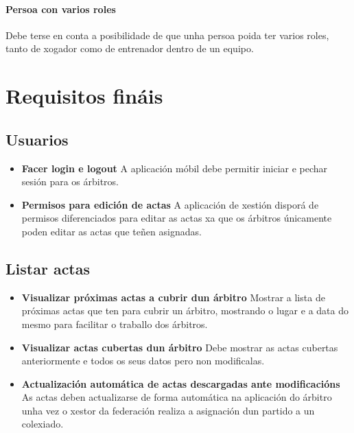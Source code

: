   \paragraph{Persoa con varios roles}
  Debe terse en conta a posibilidade de que unha persoa poida ter varios roles, 
tanto de xogador como de entrenador dentro de un equipo.
  
  \clearpage

  \section{Requisitos fináis}
  
  \subsection{Usuarios}

    \begin{itemize}

    \item \textbf{Facer login e logout}
    A aplicación móbil debe permitir iniciar e pechar sesión para os árbitros.

    \item \textbf{Permisos para edición de actas}
    A aplicación de xestión disporá de permisos diferenciados para editar as 
actas xa que os árbitros únicamente poden editar as actas que teñen asignadas.

    \end{itemize}

  \subsection{Listar actas}

    \begin{itemize}

    \item \textbf{Visualizar próximas actas a cubrir dun árbitro}
    Mostrar a lista de próximas actas que ten para cubrir un árbitro, mostrando 
o lugar e a data do mesmo para facilitar o traballo dos árbitros.

    \item \textbf{Visualizar actas cubertas dun árbitro}
    Debe mostrar as actas cubertas anteriormente e todos os seus datos pero non 
modificalas.

    \item \textbf{Actualización automática de actas descargadas ante 
modificacións}
    As actas deben actualizarse de forma automática na aplicación do árbitro 
unha vez o xestor da federación realiza a asignación dun partido a un colexiado.

    \end{itemize}

